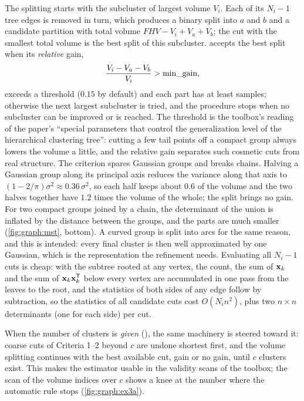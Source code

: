 The splitting starts with the subcluster of largest volume $V_i$. Each of its $N_i-1$ tree edges is removed in turn, which produces a binary split into $a$ and $b$ and a candidate partition with total volume $FHV-V_i+V_a+V_b$; the cut with the smallest total volume is the best split of this subcluster.  accepts the best split when its \emph{relative} gain,
\begin{equation}
  \frac{V_i-V_a-V_b}{V_i}>\text{\py{min_gain}},
  \label{eq:graph:gain}
\end{equation}
exceeds a threshold ($0.15$ by default) and each part has at least  samples; otherwise the next largest subcluster is tried, and the procedure stops when no subcluster can be improved or  is reached. The threshold is the toolbox's reading of the paper's ``special parameters that control the generalization level of the hierarchical clustering tree'': cutting a few tail points off a compact group always lowers the volume a little, and the relative gain separates such cosmetic cuts from real structure. The criterion spares Gaussian groups and breaks chains. Halving a Gaussian group along its principal axis reduces the variance along that axis to $(1-2/\pi)\sigma^2\approx0.36\,\sigma^2$, so each half keeps about $0.6$ of the volume and the two halves together have $1.2$ times the volume of the whole; the split brings no gain. For two compact groups joined by a chain, the determinant of the union is inflated by the distance between the groups, and the parts are much smaller (\cref{fig:graph:mst}, bottom). A curved group is split into arcs for the same reason, and this is intended: every final cluster is then well approximated by one Gaussian, which is the representation the refinement needs. Evaluating all $N_i-1$ cuts is cheap: with the subtree rooted at any vertex, the count, the sum of $\mathbf{x}_k$ and the sum of $\mathbf{x}_k\mathbf{x}_k^{\mathsf{T}}$ below every vertex are accumulated in one pass from the leaves to the root, and the statistics of both sides of any edge follow by subtraction, so the statistics of all candidate cuts cost $O(N_i n^2)$, plus two $n\times n$ determinants (one for each side) per cut.

When the number of clusters is \emph{given} (), the same machinery is steered toward it: coarse cuts of Criteria 1--2 beyond $c$ are undone shortest first, and the volume splitting continues with the best available cut, gain or no gain, until $c$ clusters exist. This makes the estimator usable in the validity scans of the toolbox; the scan of the volume indices over $c$ shows a knee at the number where the automatic rule stops (\cref{fig:graph:ex3a}).

